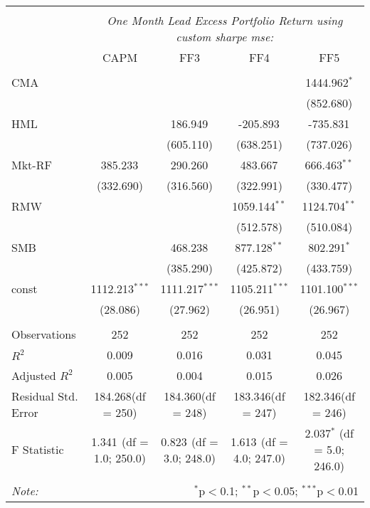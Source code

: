 \begin{table}[!htbp] \centering
\begin{tabular}{@{\extracolsep{5pt}}lcccc}
\\[-1.8ex]\hline
\hline \\[-1.8ex]
& \multicolumn{4}{c}{\textit{One Month Lead Excess Portfolio Return using custom sharpe mse:}} \
\cr \cline{4-5}
\\[-1.8ex] & CAPM & FF3 & FF4 & FF5 \\
\hline \\[-1.8ex]
 CMA & & & & 1444.962$^{*}$ \\
  & & & & (852.680) \\
 HML & & 186.949$^{}$ & -205.893$^{}$ & -735.831$^{}$ \\
  & & (605.110) & (638.251) & (737.026) \\
 Mkt-RF & 385.233$^{}$ & 290.260$^{}$ & 483.667$^{}$ & 666.463$^{**}$ \\
  & (332.690) & (316.560) & (322.991) & (330.477) \\
 RMW & & & 1059.144$^{**}$ & 1124.704$^{**}$ \\
  & & & (512.578) & (510.084) \\
 SMB & & 468.238$^{}$ & 877.128$^{**}$ & 802.291$^{*}$ \\
  & & (385.290) & (425.872) & (433.759) \\
 const & 1112.213$^{***}$ & 1111.217$^{***}$ & 1105.211$^{***}$ & 1101.100$^{***}$ \\
  & (28.086) & (27.962) & (26.951) & (26.967) \\
\hline \\[-1.8ex]
 Observations & 252 & 252 & 252 & 252 \\
 $R^2$ & 0.009 & 0.016 & 0.031 & 0.045 \\
 Adjusted $R^2$ & 0.005 & 0.004 & 0.015 & 0.026 \\
 Residual Std. Error & 184.268(df = 250) & 184.360(df = 248) & 183.346(df = 247) & 182.346(df = 246)  \\
 F Statistic & 1.341$^{}$ (df = 1.0; 250.0) & 0.823$^{}$ (df = 3.0; 248.0) & 1.613$^{}$ (df = 4.0; 247.0) & 2.037$^{*}$ (df = 5.0; 246.0) \\
\hline
\hline \\[-1.8ex]
\textit{Note:} & \multicolumn{4}{r}{$^{*}$p$<$0.1; $^{**}$p$<$0.05; $^{***}$p$<$0.01} \\
\end{tabular}
\end{table}
